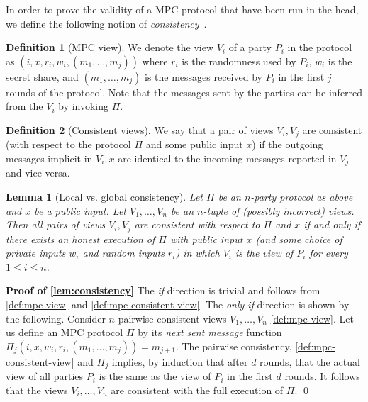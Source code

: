 \documentclass[11pt]{report}
\theoremstyle{definition}
\newtheorem{definition}{Definition}[section]
\theoremstyle{plain}
\newtheorem{lemma}{Lemma}[section]
\begin{document}
In order to prove the validity of a MPC protocol that have been run in the head, we define the following notion of \textit{consistency}~\cite{ishai2007zero}.

\begin{definition}[MPC view]\label{def:mpc-view}
  We denote the view $V_i$ of a party $P_i$ in the protocol as $(i, x, r_i, w_i, (m_1, \dots, m_j))$ where $r_i$ is the randomness used by $P_i$, $w_i$ is the secret share, and $(m_1, \dots, m_j)$ is the messages received by $P_i$ in the first $j$ rounds of the protocol. Note that the messages sent by the parties can be inferred from the $V_i$ by invoking $\Pi$.
\end{definition}

\begin{definition}[Consistent views]\label{def:mpc-consistent-view}
  We say that a pair of views $V_i, V_j$ are consistent (with respect to the protocol $\Pi$ and some public input $x$) if the outgoing messages implicit in $V_i, x$ are identical to the incoming messages reported in $V_j$ and vice versa.
\end{definition}

\begin{lemma}[Local vs. global consistency]\label{lem:consistency}
  Let $\Pi$ be an $n$-party protocol as above and $x$ be a public input.
  Let $V_1, \dots, V_n$ be an $n$-tuple of (possibly incorrect) views. Then all pairs of views $V_i, V_j$ are consistent with respect to $\Pi$ and $x$ if and only if there exists an honest execution of $\Pi$ with public input $x$ (and some choice of private inputs $w_i$ and random inputs $r_i$) in which $V_i$ is the view of $P_i$ for every $1 \leq i \leq n$.
\end{lemma}

\textbf{Proof of \autoref{lem:consistency}} The \textit{if} direction is trivial and follows from \autoref{def:mpc-view} and \autoref{def:mpc-consistent-view}.
The \textit{only if} direction is shown by the following. Consider $n$ pairwise consistent views $V_1, \dots, V_n$ \autoref{def:mpc-view}. Let us define an MPC protocol $\Pi$ by its \textit{next sent message} function $\Pi_j(i,x,w_i,r_i, (m_1, \dots, m_j)) = m_{j+1}$. The pairwise consistency, \autoref{def:mpc-consistent-view} and $\Pi_j$ implies, by induction that after $d$ rounds, that the actual view of all parties $P_i$ is the same as the view of $P_i$ in the first $d$ rounds. It follows that the views $V_i, \dots, V_n$ are consistent with the full execution of $\Pi$. \qed
\end{document}

